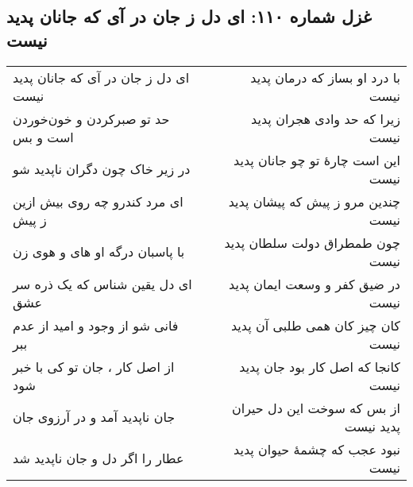 \begin{center}
\section*{غزل شماره ۱۱۰: ای دل ز جان در آی که جانان پدید نیست}
\label{sec:110}
\begin{longtable}{l p{0.5cm} r}
ای دل ز جان در آی که جانان پدید نیست
&&
با درد او بساز که درمان پدید نیست
\\
حد تو صبرکردن و خون‌خوردن است و بس
&&
زیرا که حد وادی هجران پدید نیست
\\
در زیر خاک چون دگران ناپدید شو
&&
این است چارهٔ تو چو جانان پدید نیست
\\
ای مرد کندرو چه روی بیش ازین ز پیش
&&
چندین مرو ز پیش که پیشان پدید نیست
\\
با پاسبان درگه او های و هوی زن
&&
چون طمطراق دولت سلطان پدید نیست
\\
ای دل یقین شناس که یک ذره سر عشق
&&
در ضیق کفر و وسعت ایمان پدید نیست
\\
فانی شو از وجود و امید از عدم ببر
&&
کان چیز کان همی طلبی آن پدید نیست
\\
از اصل کار ، جان تو کی با خبر شود
&&
کانجا که اصل کار بود جان پدید نیست
\\
جان ناپدید آمد و در آرزوی جان
&&
از بس که سوخت این دل حیران پدید نیست
\\
عطار را اگر دل و جان ناپدید شد
&&
نبود عجب که چشمهٔ حیوان پدید نیست
\\
\end{longtable}
\end{center}
